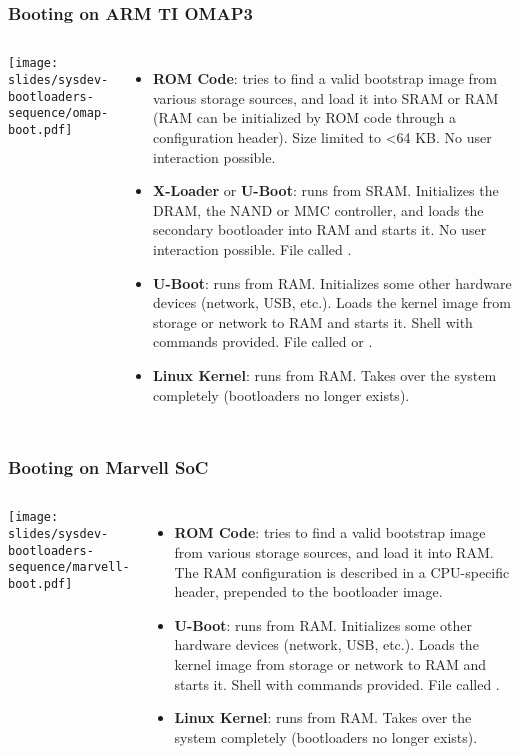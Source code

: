 \begin{frame}
\frametitle{Booting on ARM TI OMAP3}
  \begin{columns}
    \texttt{[image: slides/sysdev-bootloaders-sequence/omap-boot.pdf]}
    \footnotesize
    \begin{itemize}
    \item {\bf ROM Code}: tries to find a valid bootstrap image from
      various storage sources, and load it into SRAM or RAM (RAM can
      be initialized by ROM code through a configuration header). Size
      limited to \textless 64 KB. No user interaction possible.
    \item {\bf X-Loader} or {\bf U-Boot}: runs from SRAM. Initializes
      the DRAM, the NAND or MMC controller, and loads the secondary
      bootloader into RAM and starts it. No user interaction
      possible. File called .
    \item {\bf U-Boot}: runs from RAM. Initializes some other hardware
      devices (network, USB, etc.).  Loads the kernel image from
      storage or network to RAM and starts it. Shell with commands
      provided. File called  or .
    \item {\bf Linux Kernel}: runs from RAM. Takes over the system
      completely (bootloaders no longer exists).
    \end{itemize}
  \end{columns}
\end{frame}

\begin{frame}
  \frametitle{Booting on Marvell SoC}
  \begin{columns}
    \texttt{[image: slides/sysdev-bootloaders-sequence/marvell-boot.pdf]}
    \footnotesize
    \begin{itemize}
    \item {\bf ROM Code}: tries to find a valid bootstrap image from
      various storage sources, and load it into RAM. The RAM
      configuration is described in a CPU-specific header, prepended
      to the bootloader image.
    \item {\bf U-Boot}: runs from RAM. Initializes some other hardware
      devices (network, USB, etc.).  Loads the kernel image from
      storage or network to RAM and starts it. Shell with commands
      provided. File called .
    \item {\bf Linux Kernel}: runs from RAM. Takes over the system
      completely (bootloaders no longer exists).
    \end{itemize}
  \end{columns}
\end{frame}

